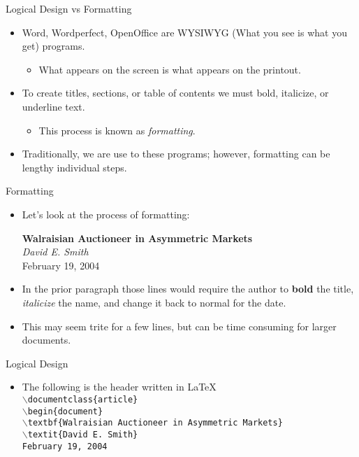 \documentclass[pdf]{prosper}
\begin{document}
\begin{slide}{Logical Design vs Formatting}
	\begin{itemize}
		\item Word, Wordperfect, OpenOffice are WYSIWYG (What you see is what you get) programs.
			\begin{itemize}
				\item What appears on the screen is what appears on the printout.
			\end{itemize}
		\item To create titles, sections, or table of contents we must bold, italicize, or underline text.
			\begin{itemize}
				\item This process is known as \textit{formatting}.
			\end{itemize}
		\item Traditionally, we are use to these programs; however, formatting can be lengthy individual steps.
	\end{itemize}
\end{slide}
\begin{slide}{Formatting}
	\begin{itemize}
		\item	Let's look at the process of formatting:
	\begin{center}
		\textbf{Walraisian Auctioneer in Asymmetric Markets}\\
		\textit{David E. Smith}\\
		February 19, 2004\\
	\end{center}
		\item In the prior paragraph those lines would require the author to \textbf{bold} the title, \textit{italicize} the name, and change it back to normal for the date.
		\item This may seem trite for a few lines, but can be time consuming for larger documents.
	\end{itemize}
\end{slide}
\begin{slide}{Logical Design}
	\begin{itemize}
		\item The following is the header written in \LaTeX\ \\
		\texttt{$\backslash$documentclass\{article\}}\\
		\texttt{$\backslash$begin\{document\}}\\
		\texttt{$\backslash$textbf\{Walraisian Auctioneer in Asymmetric Markets\}}\\
		\texttt{$\backslash$textit\{David E. Smith\}}\\
		\texttt{February 19, 2004}
	\end{itemize}
\end{slide}
\end{document}
